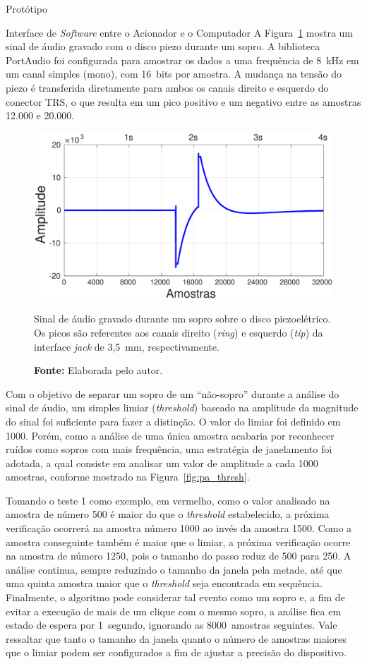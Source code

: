 \begin{chapter}{Protótipo}
\begin{section}{Interface de \textit{Software} entre o Acionador e o Computador}
A Figura~\ref{fig:pa_signal} mostra um sinal de áudio gravado com o disco piezo
durante um sopro. A biblioteca PortAudio foi configurada para amostrar os dados
a uma frequência de 8~kHz em um canal simples (mono), com 16~bits por amostra. A
mudança na tensão do piezo é transferida diretamente para ambos os canais
direito e esquerdo do conector TRS, o que resulta em um pico positivo e um
negativo entre as amostras 12.000 e 20.000.

\begin{figure}[!h]
	\centering
	\includegraphics[width=0.7\linewidth]{fig/pa_signal}
	\caption{Sinal de áudio gravado durante um sopro sobre o disco
	piezoelétrico. Os picos são referentes aos canais direito (\textit{ring}) e
	esquerdo (\textit{tip}) da interface \textit{jack} de 3,5~mm,
	respectivamente.}
	\vspace{-1cm}
	\caption*{\textbf{Fonte: }Elaborada pelo autor.}
	\label{fig:pa_signal}
\end{figure}
\vspace{-0.75cm}

Com o objetivo de separar um sopro de um ``não-sopro'' durante a análise do
sinal de áudio, um simples limiar (\textit{threshold}) baseado na amplitude da
magnitude do sinal foi suficiente para fazer a distinção. O valor do limiar foi
definido em 1000. Porém, como a análise de uma única amostra acabaria por
reconhecer ruídos como sopros com mais frequência, uma estratégia de janelamento
foi adotada, a qual consiste em analisar um valor de amplitude a cada 1000
amostras, conforme mostrado na Figura~\ref{fig:pa_thresh}.

Tomando o teste 1 como exemplo, em vermelho, como o valor analisado na amostra
de número 500 é maior do que o \textit{threshold} estabelecido, a próxima
verificação ocorrerá na amostra número 1000 ao invés da amostra 1500. Como a
amostra conseguinte também é maior que o limiar, a próxima verificação ocorre na
amostra de número 1250, pois o tamanho do passo reduz de 500 para 250. A análise
continua, sempre reduzindo o tamanho da janela pela metade, até que uma quinta
amostra maior que o \textit{threshold} seja encontrada em sequência. Finalmente,
o algoritmo pode considerar tal evento como um sopro e, a fim de evitar a
execução de mais de um clique com o mesmo sopro, a análise fica em estado de
espera por 1~segundo, ignorando as 8000~amostras seguintes. Vale ressaltar que
tanto o tamanho da janela quanto o número de amostras maiores que o limiar podem
ser configurados a fim de ajustar a precisão do dispositivo. 


\end{section}
\end{chapter}
